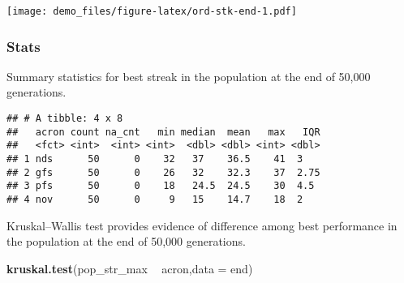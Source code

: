 \documentclass[]{book}
\newenvironment{Shaded}{\begin{snugshade}}{\end{snugshade}}
\newcommand{\DataTypeTok}[1]{\textcolor[rgb]{0.13,0.29,0.53}{#1}}
\newcommand{\KeywordTok}[1]{\textcolor[rgb]{0.13,0.29,0.53}{\textbf{#1}}}
\newcommand{\NormalTok}[1]{#1}
\newcommand{\OperatorTok}[1]{\textcolor[rgb]{0.81,0.36,0.00}{\textbf{#1}}}
\newcommand{\OtherTok}[1]{\textcolor[rgb]{0.56,0.35,0.01}{#1}}
\newcommand{\StringTok}[1]{\textcolor[rgb]{0.31,0.60,0.02}{#1}}
\begin{document}
\texttt{[image: demo\_files/figure-latex/ord-stk-end-1.pdf]}

\hypertarget{stats-4}{%
\subsubsection{Stats}\label{stats-4}}

Summary statistics for best streak in the population at the end of 50,000 generations.

\begin{Shaded}
\end{Shaded}

\begin{verbatim}
## # A tibble: 4 x 8
##   acron count na_cnt   min median  mean   max   IQR
##   <fct> <int>  <int> <int>  <dbl> <dbl> <int> <dbl>
## 1 nds      50      0    32   37    36.5    41  3   
## 2 gfs      50      0    26   32    32.3    37  2.75
## 3 pfs      50      0    18   24.5  24.5    30  4.5 
## 4 nov      50      0     9   15    14.7    18  2
\end{verbatim}

Kruskal--Wallis test provides evidence of difference among best performance in the population at the end of 50,000 generations.

\begin{Shaded}
\begin{Highlighting}[]
\KeywordTok{kruskal.test}\NormalTok{(pop_str_max }\OperatorTok{~}\StringTok{ }\NormalTok{acron,}\DataTypeTok{data =}\NormalTok{ end)}
\end{Highlighting}
\end{Shaded}
\end{document}
